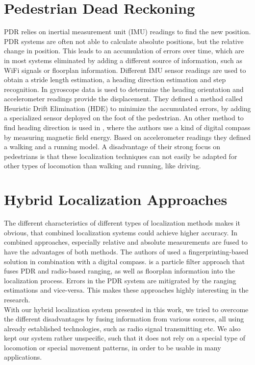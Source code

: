 \section{Pedestrian Dead Reckoning}
PDR relies on inertial measurement unit (IMU) readings to find the new position. PDR systems are often not able to calculate absolute positions, but the relative change in position. This leads to an accumulation of errors over time, which are in most systems eliminated by adding a different source of information, such as WiFi signals or floorplan information. Different IMU sensor readings are used to obtain a stride length estimation, a heading direction estimation and step recognition. In \cite{Borestein} gyroscope data is used to determine the heading orientation and accelerometer readings provide the displacement. They defined a method called Heuristic Drift Elimination (HDE) to minimize the accumulated errors, by adding a specialized sensor deployed on the foot of the pedestrian. An other method to find heading direction is used in \cite{Kakiuchi}, where the authors use a kind of digital compass by measuring magnetic field energy. Based on accelerometer readings they defined a walking and a running model. A disadvantage of their strong focus on pedestrians is that these localization techniques can not easily be adapted for other types of locomotion than walking and running, like driving.  

\section{Hybrid Localization Approaches}
The different characteristics of different types of localization methods makes it obvious, that combined localization systems could achieve higher accuracy. In combined approaches, especially relative and absolute measurements are fused to have the advantages of both methods. The authors of \cite{Nagpal} used a fingerprinting-based solution in combination with a digital compass. \cite{Carrera} is a particle filter approach that fuses PDR and radio-based ranging, as well as floorplan information into the localization process. Errors in the PDR system are mitigrated by the ranging estimations and vice-versa. This makes these approaches highly interesting in the research.\\
\noindent\hspace*{5mm}%
With our hybrid localization system presented in this work, we tried to overcome the different disadvantages by fusing information from various sources, all using already established technologies, such as radio signal transmitting etc. We also kept our system rather unspecific, such that it does not rely on a special type of locomotion or special movement patterns, in order to be usable in many applications.